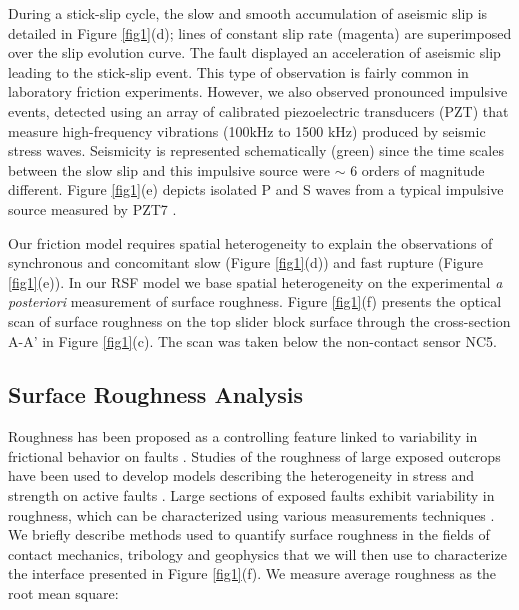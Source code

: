 \documentclass[preprint,1p, 10pt,authoryear]{elsarticle}
\begin{document}
During a stick-slip cycle, the slow and smooth accumulation of aseismic slip is detailed in Figure \ref{fig1}(d); lines of constant slip rate (magenta) are superimposed over the slip evolution curve.  The fault displayed an acceleration of aseismic slip leading to the stick-slip event. This type of observation is fairly common in laboratory friction experiments. However, we also observed pronounced impulsive events, detected using an array of calibrated piezoelectric transducers (PZT) that measure high-frequency vibrations (100kHz to 1500 kHz) produced by seismic stress waves. Seismicity is represented schematically (green) since the time scales between the slow slip and this impulsive source were $\sim$ 6 orders of magnitude different.  Figure \ref{fig1}(e) depicts isolated P and S waves from a typical impulsive source measured by PZT7  \citep{Selvadurai2019}.
 
Our friction model requires spatial heterogeneity to explain the observations of synchronous and concomitant slow (Figure \ref{fig1}(d)) and fast rupture (Figure \ref{fig1}(e)). In our RSF model we base spatial heterogeneity  on the experimental \textit{a posteriori} measurement of surface roughness. Figure \ref{fig1}(f) presents the optical scan of surface roughness on the top slider block surface through the cross-section A-A' in Figure \ref{fig1}(c). The scan was taken below the non-contact sensor NC5.

\subsection{Surface Roughness Analysis}
\label{SRA}

Roughness has been proposed as a controlling feature linked to variability in frictional behavior on faults \citep{Scholz1986,Scholz2002}. Studies of the roughness of large exposed outcrops have been used to develop models describing the heterogeneity in stress and strength on active faults \citep[e.g.,][]{Schmittbuhl2006}. Large sections of exposed faults exhibit variability in roughness, which can be characterized using various measurements techniques \citep{Power1991, Schmittbuhl1995, Renard2006, Candela2009,Brodsky2011, Siman-Tov2013, Kirkpatrick2014, Candela2016, Brodsky2016}. We briefly describe methods used to quantify surface roughness in the fields of contact mechanics, tribology and geophysics that we will then use to characterize the interface presented in Figure \ref{fig1}(f). We measure average roughness as the root mean square:
\end{document}

